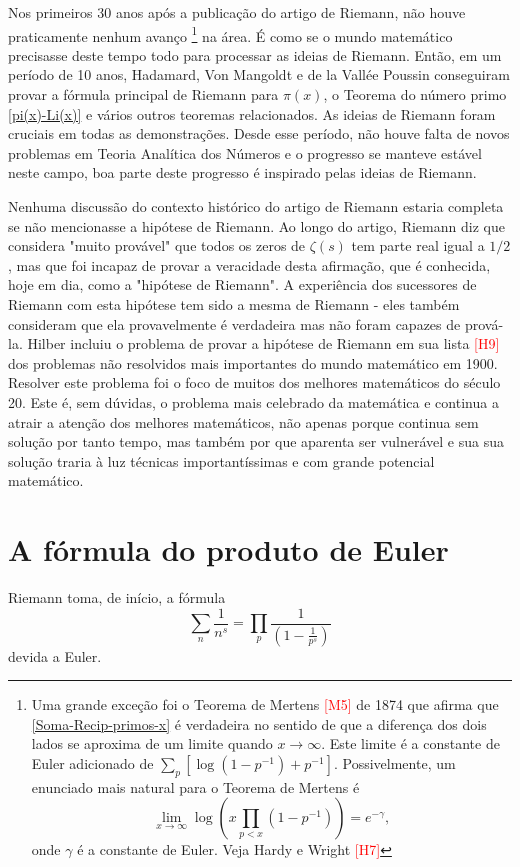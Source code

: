     Nos primeiros 30 anos após a publicação do artigo de Riemann, não houve praticamente nenhum avanço
    \footnote{ Uma grande exceção foi o Teorema de Mertens \textcolor{red}{[M5]} de 1874 que afirma que \eqref{Soma-Recip-primos-x} é verdadeira no sentido de que a diferença dos dois lados se aproxima de um limite quando $x \to \infty$. Este limite é a constante de Euler adicionado de $\sum_{p}[\log(1-p^{-1}) + p^{-1}]$. Possivelmente, um enunciado mais natural para o Teorema de Mertens é 
    $$\lim_{x \to \infty} \log \left( x \prod_{p<x}(1-p^{-1}) \right) = e^{-\gamma},$$
    onde $\gamma$ é a constante de Euler. Veja Hardy e Wright \textcolor{red}{[H7]}}
    na área. É como se o mundo matemático precisasse deste tempo todo para processar as ideias de Riemann. Então, em um período de 10 anos, Hadamard, Von Mangoldt e de la Vallée Poussin conseguiram provar a fórmula principal de Riemann para $\pi(x)$, o Teorema do número primo \eqref{pi(x)-Li(x)} e vários outros teoremas relacionados. As ideias de Riemann foram cruciais em todas as demonstrações. Desde esse período, não houve falta de novos problemas em Teoria Analítica dos Números e o progresso se manteve estável neste campo, boa parte deste progresso é inspirado pelas ideias de Riemann. 
    
    Nenhuma discussão do contexto histórico do artigo de Riemann estaria completa se não mencionasse a hipótese de Riemann. Ao longo do artigo, Riemann diz que considera "muito provável" que todos os zeros de $\zeta(s)$ tem parte real igual a $1/2$, mas que foi incapaz de provar a veracidade desta afirmação, que é conhecida, hoje em dia, como a "hipótese de Riemann". A experiência dos sucessores de Riemann com esta hipótese tem sido a mesma de Riemann - eles também consideram que ela provavelmente é verdadeira mas não foram capazes de prová-la. Hilber incluiu o problema de provar a hipótese de Riemann em sua lista \textcolor{red}{[H9]} dos problemas não resolvidos mais importantes do mundo matemático em 1900. Resolver este problema foi o foco de muitos dos melhores matemáticos do século 20. Este é, sem dúvidas, o problema mais celebrado da matemática e continua a atrair a atenção dos melhores matemáticos, não apenas porque continua sem solução por tanto tempo, mas também por que aparenta ser vulnerável e sua sua solução traria à luz técnicas importantíssimas e com grande potencial matemático. 
    
    
    
    \section*{A fórmula do produto de Euler}
    
    
    Riemann toma, de início, a fórmula
    \begin{equation}
        \label{Euler-prod}
        \sum_{n} \frac{1}{n^s} = \prod_{p} \frac{1}{\left( 1 - \frac{1}{p^s}\right)}
    \end{equation}
    devida a Euler.
    
    













